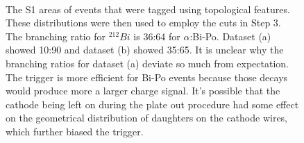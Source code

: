 \begin{figure}[hbtp]
\centering
{}\\
\caption[]{The S1 areas of events that were tagged using topological features. These distributions were then used to employ the cuts in Step 3. The branching ratio for $^{212}Bi$ is 36:64 for $\alpha$:Bi-Po. Dataset (a) showed 10:90 and dataset (b) showed 35:65. It is unclear why the branching ratios for dataset (a) deviate so much from expectation. The trigger is more efficient for Bi-Po events because those decays would produce more a larger charge signal. It's possible that the cathode being left on during the plate out procedure had some effect on the geometrical distribution of daughters on the cathode wires, which further biased the trigger.}
\label{fig:area_cut}
\end{figure}


